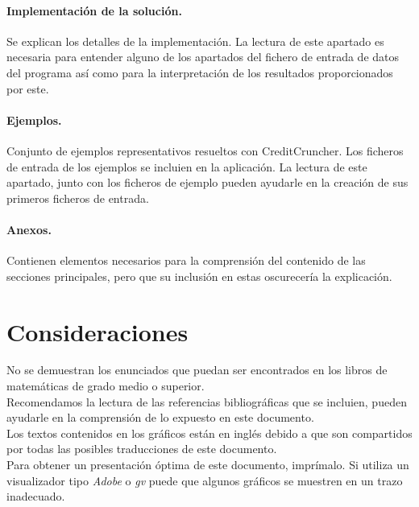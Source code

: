 \paragraph{Implementaci\'on de la soluci\'on.} Se explican los detalles de
la implementaci\'on. La lectura de este apartado es necesaria para entender 
alguno de los apartados del fichero de entrada de datos del programa as\'i como 
para la interpretaci\'on de los resultados proporcionados por este.

\paragraph{Ejemplos.} Conjunto de ejemplos representativos resueltos con
CreditCruncher. Los ficheros de entrada de los ejemplos se incluien en la
aplicaci\'on. La lectura de este apartado, junto con los ficheros de ejemplo 
pueden ayudarle en la creaci\'on de sus primeros ficheros de entrada.

\paragraph{Anexos.} Contienen elementos necesarios para la comprensi\'on del 
contenido de las secciones principales, pero que su inclusi\'on en estas 
oscurecer\'ia la explicaci\'on.

\section{Consideraciones}

No se demuestran los enunciados que puedan ser encontrados en los libros de 
matem\'aticas de grado medio o superior. \\

Recomendamos la lectura de las referencias bibliogr\'aficas que se incluien, 
pueden ayudarle en la comprensi\'on de lo expuesto en este documento.\\

Los textos contenidos en los gr\'aficos est\'an en ingl\'es debido a que son 
compartidos por todas las posibles traducciones de este documento.\\

Para obtener un presentaci\'on \'optima de este documento, impr\'imalo. Si 
utiliza un visualizador tipo \emph{Adobe} o \emph{gv} puede que algunos 
gr\'aficos se muestren en un trazo inadecuado.

